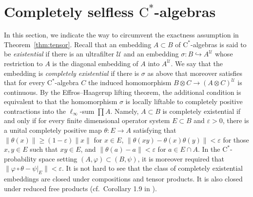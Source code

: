 \documentclass[12pt,nosumlimits,nonamelimits]{amsart}
\theoremstyle{remark}
\theoremstyle{definition}
\newcommand{\cU}{\mathcal{U}}
\newcommand{\ve}{\varepsilon}
\newcommand{\vp}{\varphi}
\begin{document}
\section{Completely selfless $\mathrm{C}^*$-alge\-bras}\label{sec:cs}
%
In this section, we indicate the way to circumvent 
the exactness assumption in Theorem~\ref{thm:tensor}. 
Recall that an embedding $A\subset B$ of $\mathrm{C}^*$-alge\-bras 
is said to be \emph{existential} if there is an ultrafilter $\cU$ and 
an embedding $\sigma\colon B\hookrightarrow A^\cU$ 
whose restriction to $A$ is the diagonal embedding of $A$ into $A^\cU$. 
We say that the embedding is \emph{completely existential} if 
there is $\sigma$ as above that moreover satisfies that 
for every $\mathrm{C}^*$-alge\-bra $C$ 
the induced homomorphism $B\otimes C \to (A\otimes C)^\cU$ 
is continuous. By the Effros--Haagerup lifting theorem, 
the additional condition is equivalent to that 
the homomorphism $\sigma$ is locally liftable to 
completely positive contractions into the $\ell_\infty$-sum $\prod A$. 
Namely, $A\subset B$ is completely existential if and only if 
for every finite dimensional operator system $E\subset B$ 
and $\ve>0$, there is a unital completely positive 
map $\theta\colon E\to A$ satisfying that 
$\|\theta(x) \| \geq (1-\ve)\|x\|$ for $x\in E$, 
$\|\theta(xy) - \theta(x)\theta(y)\|<\ve$ 
for those $x,y\in E$ such that $xy\in E$, 
and $\|\theta(a) -a \|<\ve$ for $a\in E\cap A$. 
In the $\mathrm{C}^*$-prob\-a\-bility space 
setting $(A,\vp)\subset(B,\psi)$, it is moreover required 
that $\|\vp\circ\theta - \psi|_E\|<\ve$.
It is not hard to see that the class of completely existential 
embeddings are closed under compositions and tensor products. 
It is also closed under reduced free products (cf.\ Corollary 1.9 in \cite{robert}).
\end{document}
